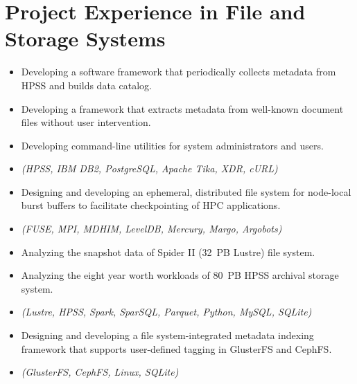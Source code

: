 \section{Project Experience in File and Storage Systems}

\begin{itemize}
 \item {Developing a software framework that periodically collects metadata from HPSS and builds data catalog.}
 \item {Developing a framework that extracts metadata from well-known document files without user intervention.}
 \item {Developing command-line utilities for system administrators and users.}
 \item {\it\small (HPSS, IBM DB2, PostgreSQL, Apache Tika, XDR, cURL)}
\end{itemize}

\begin{itemize}
 \item {Designing and developing an ephemeral, distributed file system for node-local burst buffers to
               facilitate checkpointing of HPC applications.}
 \item {\it\small (FUSE, MPI, MDHIM, LevelDB, Mercury, Margo, Argobots)}
\end{itemize}

\begin{itemize}
 \item {Analyzing the snapshot data of Spider II (32~PB Lustre) file system.}
 \item {Analyzing the eight year worth workloads of 80~PB HPSS archival storage system.}
 \item {\it\small (Lustre, HPSS, Spark, SparSQL, Parquet, Python, MySQL, SQLite)}
\end{itemize}

\begin{itemize}
 \item {Designing and developing a file system-integrated metadata indexing framework that supports user-defined tagging in GlusterFS and CephFS.}
 \item {\it\small (GlusterFS, CephFS, Linux, SQLite)}
\end{itemize}

